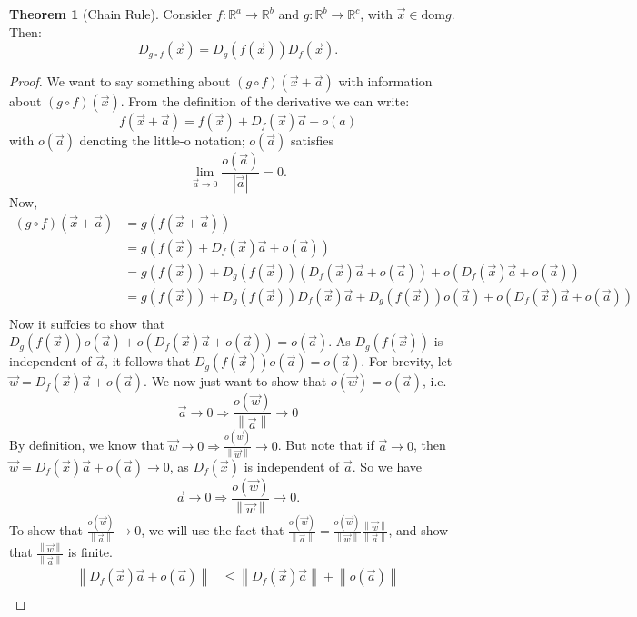 \documentclass{article}
\theoremstyle{definition}
\newtheorem{thm}{Theorem}[subsubsection]
\begin{document}
\begin{thm}[Chain Rule]
	Consider $f:\mathbb{R}^a\rightarrow\mathbb{R}^b$ and $g:\mathbb{R}^b\rightarrow\mathbb{R}^c$, with $\vec{x}\in\text{dom} g$. Then:
	\[D_{g\circ f}(\vec{x})=D_g(f(\vec{x}))D_f(\vec{x}).\]
\end{thm}
\begin{proof}
	We want to say something about $(g\circ f)(\vec x+\vec a)$ with information about $(g\circ f)(\vec x)$.
	From the definition of the derivative we can write:
	\[f(\vec{x}+\vec{a})=f(\vec{x})+D_f(\vec{x})\vec{a}+o(a)\]
	with $o(\vec{a})$ denoting the little-o notation; $o(\vec{a})$ satisfies \[\lim\limits_{\vec{a}\rightarrow0}\frac{o(\vec{a})}{|\vec{a}|}=0.\]
	Now, 
	\begin{align*}
		(g\circ f)(\vec{x}+\vec{a})&=g(f(\vec{x}+\vec{a}))\\
		&=g(f(\vec{x})+D_f(\vec{x})\vec{a}+o(\vec a))\\
		&=g(f(\vec{x}))+D_g(f(\vec{x}))(D_f(\vec{x})\vec{a}+o(\vec a))+o(D_f(\vec{x})\vec{a}+o(\vec a))\\
		&=g(f(\vec{x}))+D_g(f(\vec{x}))D_f(\vec{x})\vec{a}+D_g(f(\vec{x}))o(\vec a)+o(D_f(\vec{x})\vec{a}+o(\vec a))\\
	\end{align*}
	Now it suffcies to show that $D_g(f(\vec{x}))o(\vec a)+o(D_f(\vec{x})\vec{a}+o(\vec a))=o(\vec a)$. As $D_g(f(\vec{x}))$ is independent of $\vec a$, it follows that $D_g(f(\vec{x}))o(\vec a)=o(\vec a)$. 
	For brevity, let $\vec w=D_f(\vec{x})\vec{a}+o(\vec a)$. We now just want to show that $o(\vec w)=o(\vec a)$, i.e.
	\[\vec a\rightarrow0\Rightarrow\frac{o(\vec w)}{\left\lVert \vec a\right\rVert}\rightarrow0\]
	By definition, we know that
	$\vec w\rightarrow0\Rightarrow\frac{o(\vec w)}{\left\lVert \vec w\right\rVert}\rightarrow0$. But note that if $\vec a\rightarrow0$, then $\vec w=D_f(\vec{x})\vec{a}+o(\vec a)\rightarrow0$, as $D_f(\vec{x})$ is independent of $\vec a$. So we have 
	\[\vec a\rightarrow0\Rightarrow\frac{o(\vec w)}{\left\lVert \vec w\right\rVert}\rightarrow0.\]
	To show that $\frac{o(\vec w)}{\left\lVert \vec a\right\rVert}\rightarrow0$, we will use the fact that $\frac{o(\vec w)}{\left\lVert\vec a\right\rVert}=\frac{o(\vec w)}{\left\lVert\vec w\right\rVert}\frac{\left\lVert\vec w\right\rVert}{\left\lVert\vec a\right\rVert}$, and show that $\frac{\left\lVert\vec w\right\rVert}{\left\lVert\vec a\right\rVert}$ is finite.
	\begin{align*}
		\left\lVert D_f(\vec{x})\vec{a}+o(\vec a)\right\rVert&\leq\left\lVert D_f(\vec{x})\vec{a}\right\rVert+\left\lVert o(\vec a)\right\rVert\\

\end{align*}
\end{proof}
\end{document}
